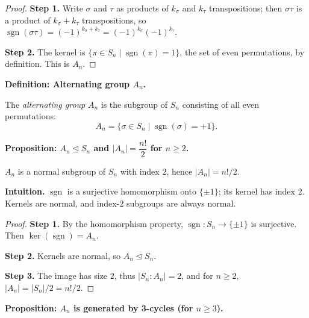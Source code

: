 \documentclass[9pt]{article}
\theoremstyle{definition}
\begin{document}
\dotfill

\begin{proof}
\textbf{Step 1.} Write $\sigma$ and $\tau$ as products of $k_\sigma$ and $k_\tau$ transpositions; then $\sigma\tau$ is a product of $k_\sigma+k_\tau$ transpositions, so $\operatorname{sgn}(\sigma\tau)=(-1)^{k_\sigma+k_\tau}=(-1)^{k_\sigma}(-1)^{k_\tau}$.

\textbf{Step 2.} The kernel is $\{\pi\in S_n\mid \operatorname{sgn}(\pi)=1\}$, the set of even permutations, by definition. This is $A_n$.
\end{proof}

\newpage


\noindent\textbf{Definition: Alternating group $A_n$.}

\newpage

The \emph{alternating group} $A_n$ is the subgroup of $S_n$ consisting of all even permutations:
\[
A_n=\{\sigma\in S_n\mid \operatorname{sgn}(\sigma)=+1\}.
\]

\newpage


\noindent\textbf{Proposition: $A_n\trianglelefteq S_n$ and $|A_n|=\dfrac{n!}{2}$ for $n\ge2$.}

\newpage

$A_n$ is a normal subgroup of $S_n$ with index $2$, hence $|A_n|=n!/2$.

\dotfill

\noindent\textbf{Intuition.}
$\operatorname{sgn}$ is a surjective homomorphism onto $\{\pm1\}$; its kernel has index $2$. Kernels are normal, and index-$2$ subgroups are always normal.

\dotfill

\begin{proof}
\textbf{Step 1.} By the homomorphism property, $\operatorname{sgn}:S_n\to\{\pm1\}$ is surjective. Then $\ker(\operatorname{sgn})=A_n$.

\textbf{Step 2.} Kernels are normal, so $A_n\trianglelefteq S_n$.

\textbf{Step 3.} The image has size $2$, thus $|S_n:A_n|=2$, and for $n\ge2$, $|A_n|=|S_n|/2=n!/2$.
\end{proof}

\newpage


\noindent\textbf{Proposition: $A_n$ is generated by 3-cycles (for $n\ge3$).}
\end{document}
